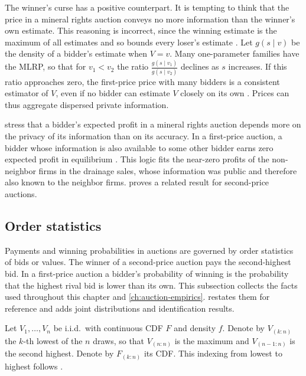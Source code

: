 \begin{remark}\label{rem:14-aggregation}
The winner's curse has a positive counterpart. It is tempting to think that the price in a mineral rights
auction conveys no more information than the winner's own estimate. This reasoning is incorrect, since the
winning estimate is the maximum of all estimates and so bounds every loser's estimate
\citep[p.~1094]{MilgromWeber1982}. Let $g(s\mid v)$ be the density of a bidder's estimate when $V=v$. Many
one-parameter families have the MLRP, so that for $v_1<v_2$ the ratio $\frac{g(s\mid v_1)}{g(s\mid v_2)}$
declines as $s$ increases. If this ratio approaches zero, the first-price price with many bidders is a
consistent estimator of $V$, even if no bidder can estimate $V$ closely on its own
\citep{Wilson1977,Milgrom1979}. Prices can thus aggregate dispersed private information.
\end{remark}

\begin{remark}\label{rem:14-privacy}
\citet[p.~1094]{MilgromWeber1982} stress that a bidder's expected profit in a mineral rights auction depends
more on the privacy of its information than on its accuracy. In a first-price auction, a bidder whose
information is also available to some other bidder earns zero expected profit in equilibrium
\citep{EngelbrechtWiggansMilgromWeber1983}. This logic fits the near-zero profits of the non-neighbor firms
in the drainage sales, whose information was public and therefore also known to the neighbor firms.
 proves a related result for second-price auctions.
\end{remark}

\subsection{Order statistics}\label{sec:14-orderstats}

Payments and winning probabilities in auctions are governed by order statistics of bids or values. The
winner of a second-price auction pays the second-highest bid. In a first-price auction a bidder's
probability of winning is the probability that the highest rival bid is lower than its own. This subsection
collects the facts used throughout this chapter and \cref{ch:auction-empirics}. 
restates them for reference and adds joint distributions and identification results.

Let $V_1,\dots,V_n$ be i.i.d.\ with continuous CDF $F$ and density $f$. Denote by $V_{(k:n)}$ the $k$-th lowest
of the $n$ draws, so that $V_{(n:n)}$ is the maximum and $V_{(n-1:n)}$ is the second highest. Denote by
$F_{(k:n)}$ its CDF. This indexing from lowest to highest follows \citet[Section~2.1]{AtheyHaile2007}.

